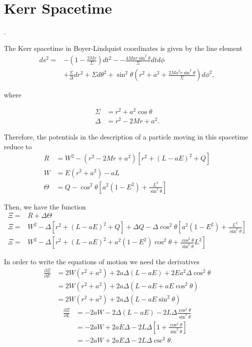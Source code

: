 
\section{Kerr Spacetime}.

The Kerr spacetime in Boyer-Lindquist coordinates is given by the line element
\begin{align}
	ds^2 = &-\left( 1- \frac{2Mr}{\Sigma} \right) dt^2 - -\frac{4Mar\sin^2 \theta}{\Sigma} dt d\phi\\
	&+ \frac{\Sigma}{\Delta} dr^2 +\Sigma d\theta^2 + \sin^2 \theta \left( r^2 + a^2 +\frac{2Ma^2 r \sin^2 \theta}{\Sigma} \right) d\phi^2,
\end{align}

where

\begin{align}
	\Sigma &= r^2 + a^2 \cos \theta \\
	\Delta &= r^2 - 2Mr + a^2.
\end{align}

Therefore, the potentials in the description of a particle moving in this spacetime reduce to
\begin{align}
	R &= W^2 - (r^2 - 2Mr + a^2) \left[ r^2 + (L-aE)^2 + Q \right]\\
	W &= E(r^2 + a^2) - aL\\
	\Theta &= Q - \cos^2 \theta \left[ a^2 (1-E^2) + \frac{L^2}{\sin^2 \theta} \right]
\end{align}

Then, we have the function
\begin{align}
	\Xi = &R + \Delta \Theta \nonumber \\
	\Xi = &W^2 - \Delta  \left[ r^2 + (L-aE)^2 + Q \right] + \Delta Q  - \Delta \cos^2 \theta  \left[ a^2 (1-E^2) + \frac{L^2}{\sin^2 \theta} \right] \nonumber \\ 
	\Xi = &W^2  - \Delta \left[ r^2 + (L-aE)^2  
	+  a^2 (1-E^2)  \cos^2 \theta + \frac{\cos^2 \theta }{\sin^2 \theta} L^2  \right] 
\end{align}


In order to write the equations of motion we need the derivatives
\begin{align}
\frac{\partial \Xi}{\partial E} &= 2W(r^2 + a^2) + 2a \Delta (L-aE) + 2E a^2 \Delta \cos^2 \theta \nonumber  \\
										&= 2W(r^2 + a^2) + 2a \Delta \left( L-aE  + aE  \cos^2 \theta \right) \nonumber \\
										&= 2W(r^2 + a^2) + 2a \Delta \left( L-aE \sin^2 \theta \right)
\end{align}
\begin{align}
\frac{\partial \Xi}{\partial L} &= - 2a W - 2 \Delta (L-aE) - 2L \Delta \frac{\cos^2 \theta }{\sin^2 \theta}   \nonumber \\
						&= - 2a W + 2 aE \Delta   - 2L \Delta \left[ 1 + \frac{\cos^2 \theta }{\sin^2 \theta} \right] \nonumber \\											
						&= - 2a W + 2 aE \Delta   - 2L \Delta \csc^2 \theta . 
\end{align}

